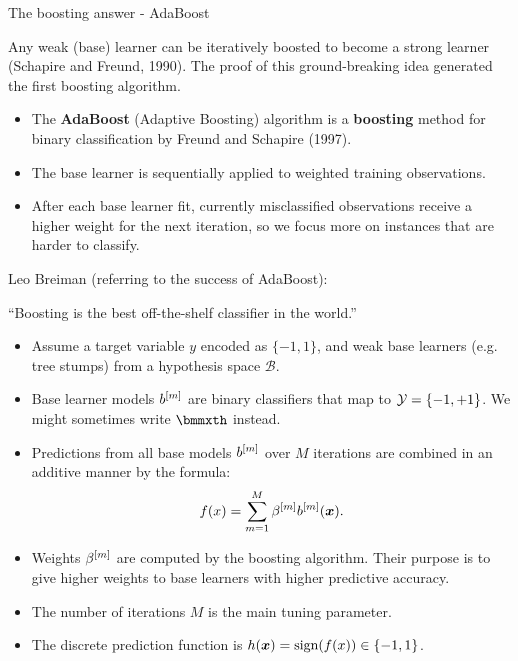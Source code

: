 
\begin{vbframe}{The boosting answer - AdaBoost}

Any weak (base) learner can be iteratively boosted to become
a strong learner (Schapire and Freund, 1990).
The proof of this ground-breaking idea generated the first boosting algorithm.

\begin{itemize}
  \item The \textbf{AdaBoost} (Adaptive Boosting) algorithm is a \textbf{boosting} method
    for binary classification by Freund and Schapire (1997).
  \item The base learner is sequentially applied to weighted training observations.
  \item After each base learner fit, currently misclassified observations receive a higher weight for
    the next iteration, so we focus more on instances that are harder to classify.
\end{itemize}

Leo Breiman (referring to the success of AdaBoost):

\enquote{Boosting is the best off-the-shelf classifier in the world.}

\framebreak

\begin{itemize}
  \item Assume a target variable $y$ encoded as $\{-1,1\}$,
    and weak base learners (e.g. tree stumps) from a hypothesis space $\mathcal{B}$.
  \item Base learner models $b^{[m]}$ are binary classifiers that map to $\mathcal{Y} = \{-1,+1\}$.
    We might sometimes write $\bmmxth$ instead.
  \item Predictions from all base models $b^{[m]}$ over $M$ iterations are combined in an additive manner by the formula:
    $$
    f(x) = \sum_{m=1}^{M} \beta^{[m]} b^{[m]}(\bm{x}).
    $$
  \item Weights $\beta^{[m]}$ are computed by the boosting algorithm.
    Their purpose is to give higher weights to base learners with higher predictive accuracy.
  \item The number of iterations $M$ is the main tuning parameter.
  \item The discrete prediction function is $h(\bm{x}) = \text{sign}(f(x)) \in \{-1,1\}$.
\end{itemize}


\end{vbframe}
